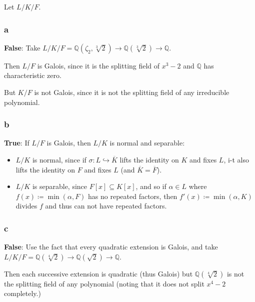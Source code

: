 \begin{solution}

Let \(L/K/F\).

\hypertarget{a-58}{%
\subsubsection{a}\label{a-58}}

\textbf{False}: Take
\(L/K/F = {\mathbb{Q}}(\zeta_2, \sqrt[3] 2) \to {\mathbb{Q}}(\sqrt[3] 2) \to {\mathbb{Q}}\).

Then \(L/F\) is Galois, since it is the splitting field of \(x^3 - 2\)
and \({\mathbb{Q}}\) has characteristic zero.

But \(K/F\) is not Galois, since it is not the splitting field of any
irreducible polynomial.

\hypertarget{b-48}{%
\subsubsection{b}\label{b-48}}

\textbf{True}: If \(L/F\) is Galois, then \(L/K\) is normal and
separable:

\begin{itemize}
\item
  \(L/K\) is normal, since if \(\sigma: L \hookrightarrow\overline K\)
  lifts the identity on \(K\) and fixes \(L\), i-t also lifts the
  identity on \(F\) and fixes \(L\) (and \(\overline K = \overline F\)).
\item
  \(L/K\) is separable, since \(F[x] \subseteq K[x]\), and so if
  \(\alpha \in L\) where \(f(x) \coloneqq\min(\alpha, F)\) has no
  repeated factors, then \(f'(x) \coloneqq\min(\alpha, K)\) divides
  \(f\) and thus can not have repeated factors.
\end{itemize}

\hypertarget{c-32}{%
\subsubsection{c}\label{c-32}}

\textbf{False}: Use the fact that every quadratic extension is Galois,
and take
\(L/K/F = {\mathbb{Q}}(\sqrt[4] 2) \to {\mathbb{Q}}(\sqrt 2) \to {\mathbb{Q}}\).

Then each successive extension is quadratic (thus Galois) but
\({\mathbb{Q}}(\sqrt[4] 2)\) is not the splitting field of any
polynomial (noting that it does not split \(x^4 - 2\) completely.)

\end{solution}

